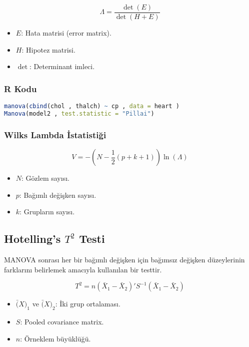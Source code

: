 \[ \Lambda = \frac{\det(E)}{\det(H + E)} \]

\begin{itemize}
	\item $E$: Hata matrisi (error matrix).
	\item $H$: Hipotez matrisi.
	\item $\det$: Determinant imleci.
\end{itemize}

\subsubsection{R Kodu}

\begin{lstlisting}[language=R]
manova(cbind(chol , thalch) ~ cp , data = heart )
Manova(model2 , test.statistic = "Pillai")
\end{lstlisting}

\subsubsection{Wilks Lambda İstatistiği}

\[ V = -\left( N - \frac{1}{2}(p + k + 1) \right) \ln(\Lambda) \]

\begin{itemize}
	\item $N$: Gözlem sayısı.
	\item $p$: Bağımlı değişken sayısı.
	\item $k$: Grupların sayısı.
\end{itemize}


\newpage

\subsection{Hotelling's $T^2$ Testi}
MANOVA sonrası her bir bağımlı değişken için bağımsız değişken düzeylerinin farklarını belirlemek amacıyla kullanılan bir testtir.

\[ T^2 = n (\bar{X}_1 - \bar{X}_2)' S^{-1} (\bar{X}_1 - \bar{X}_2) \]

\begin{itemize}
	\item $\bar(X)_1$ ve $\bar(X)_2$: İki grup ortalaması.
	\item $S$: Pooled covariance matrix.
	\item $n$: Örneklem büyüklüğü.
\end{itemize}

\newpage

